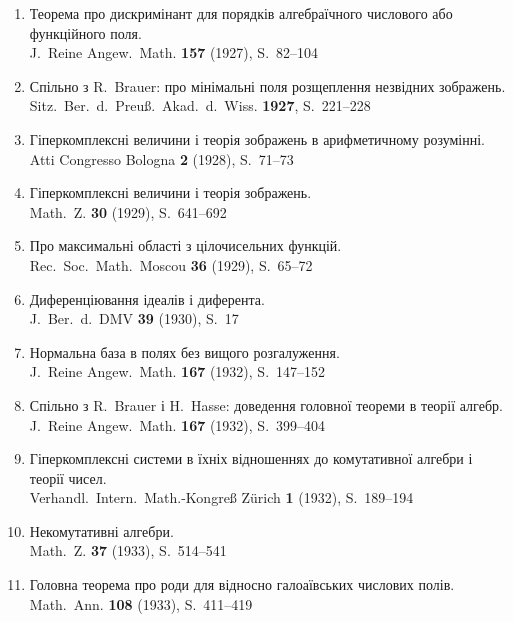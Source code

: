 \documentclass[11pt]{article}
\newcommand{\foreign}[1]{#1}
\begin{document}
\begin{enumerate}[label={\small\arabic*.},leftmargin=2em,itemsep=0.3em]
\item Теорема про дискримінант для порядків алгебраїчного числового або функційного поля.\\
\foreign{J.\ Reine Angew.\ Math.} \textbf{157} (1927), S.~82--104

\item Спільно з R.\ Brauer: про мінімальні поля розщеплення незвідних зображень.\\
\foreign{Sitz.\ Ber.\ d.\ Preuß.\ Akad.\ d.\ Wiss.} \textbf{1927}, S.~221--228

\item Гіперкомплексні величини і теорія зображень в арифметичному розумінні.\\
\foreign{Atti Congresso Bologna} \textbf{2} (1928), S.~71--73

\item Гіперкомплексні величини і теорія зображень.\\
\foreign{Math.\ Z.} \textbf{30} (1929), S.~641--692

\item Про максимальні області з цілочисельних функцій.\\
\foreign{Rec.\ Soc.\ Math.\ Moscou} \textbf{36} (1929), S.~65--72

\item Диференціювання ідеалів і диферента.\\
\foreign{J.\ Ber.\ d.\ DMV} \textbf{39} (1930), S.~17

\item Нормальна база в полях без вищого розгалуження.\\
\foreign{J.\ Reine Angew.\ Math.} \textbf{167} (1932), S.~147--152

\item Спільно з R.\ Brauer і H.\ Hasse: доведення головної теореми в теорії алгебр.\\
\foreign{J.\ Reine Angew.\ Math.} \textbf{167} (1932), S.~399--404

\item Гіперкомплексні системи в їхніх відношеннях до комутативної алгебри і теорії чисел.\\
\foreign{Verhandl.\ Intern.\ Math.-Kongreß Zürich} \textbf{1} (1932), S.~189--194

\item Некомутативні алгебри.\\
\foreign{Math.\ Z.} \textbf{37} (1933), S.~514--541

\item Головна теорема про роди для відносно галоаївських числових полів.\\
\foreign{Math.\ Ann.} \textbf{108} (1933), S.~411--419


\end{enumerate}
\end{document}
